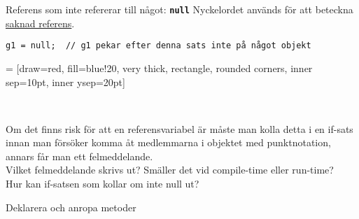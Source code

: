 \documentclass{lecturenotes}
\begin{document}
\begin{Slide}{Referens som inte refererar till något: \texttt{\textbf{null}}}
Nyckelordet  används för att beteckna \href{http://www.programcreek.com/2013/12/what-exactly-is-null-in-java/}{saknad referens}.
\begin{lstlisting}
g1 = null;  // g1 pekar efter denna sats inte på något objekt
\end{lstlisting}
 = [draw=red, fill=blue!20, very thick,
    rectangle, rounded corners, inner sep=10pt, inner ysep=20pt]
 \\ \vspace{1em}

\scriptsize Om det finns risk för att en referensvariabel är  måste man kolla detta i en if-sats innan man försöker komma åt medlemmarna i objektet med punktnotation, annars får man ett felmeddelande. \\ \vspace{1em} Vilket felmeddelande skrivs ut? Smäller det vid compile-time eller run-time?\\ Hur kan if-satsen som kollar om inte null ut?
\end{Slide}



\begin{Slide}{Deklarera och anropa metoder}

\end{Slide}
\end{document}
